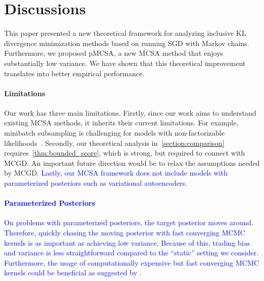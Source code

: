 
\vspace{-0.1in}
\section{Discussions}\label{section:discussion}
\vspace{-0.12in}
This paper presented a new theoretical framework for analyzing inclusive KL divergence minimization methods based on running SGD with Markov chains.
Furthermore, we proposed pMCSA, a new MCSA method that enjoys substantially low variance.
We have shown that this theoretical improvement translates into better empirical performance.

\vspace{-0.12in}
\paragraph{Limitations}
Our work has three main limitations.
Firstly, since our work aims to understand existing MCSA methods, it inherits their current limitations.
For example, minibatch subsampling is challenging for models with non-factorizable likelihoods~\citep{NEURIPS2020_b2070693}.
Secondly, our theoretical analysis in~\cref{section:comparison} requires~\cref{thm:bounded_score}, which is strong, but required to connect with MCGD.
An important future direction would be to relax the assumptions needed by MCGD.
\textcolor{blue}{%
 Lastly, our MCSA framework does not include models with parameterized posteriors such as variational autoencoders.
}

\textcolor{blue}{
\vspace{-0.12in}
\paragraph{Parameterized Posteriors}
On problems with parameterized posteriors, the target posterior moves around.
Therefore, quickly chasing the moving posterior with fast converging MCMC kernels is as important as achieving low variance.
Because of this, trading bias and variance is less straightforward compared to the ``static'' setting we consider.
Furthermore, the usage of computationally expensive but fast converging MCMC kernels could be beneficial as suggested by \citet{zhang_transport_2022}.
}

\vspace{-0.12in}
